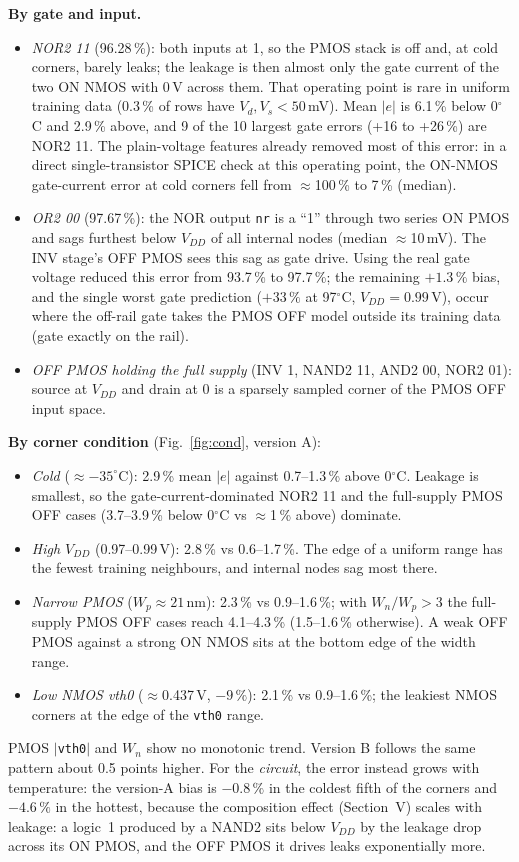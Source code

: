 ﻿\documentclass[conference,10pt]{IEEEtran}
\newcommand{\cc}[1]{\texttt{#1}}
\newcommand{\pct}{\,\%}
\begin{document}
\textbf{By gate and input.}
\begin{itemize}
\item \emph{NOR2 11} (96.28\pct): both inputs at 1, so the PMOS stack is off and, at cold corners,
barely leaks; the leakage is then almost only the gate current of the two ON NMOS with 0\,V across
them. That operating point is rare in uniform training data (0.3\pct{} of rows have $V_d,V_s<50$\,mV).
Mean $|e|$ is 6.1\pct{} below 0$^\circ$C and 2.9\pct{} above, and 9 of the 10 largest gate errors
(+16 to +26\pct) are NOR2 11. The plain-voltage features already removed most of this error: in a
direct single-transistor SPICE check at this operating point, the ON-NMOS gate-current error at
cold corners fell from $\approx$100\pct{} to 7\pct{} (median).
\item \emph{OR2 00} (97.67\pct): the NOR output \cc{nr} is a ``1'' through two series ON PMOS and
sags furthest below $V_{DD}$ of all internal nodes (median $\approx$10\,mV). The INV stage's OFF
PMOS sees this sag as gate drive. Using the real gate voltage reduced this error from 93.7\pct{} to
97.7\pct; the remaining $+1.3\pct$ bias, and the single worst gate prediction ($+33\pct$ at
97$^\circ$C, $V_{DD}=0.99$\,V), occur where the off-rail gate takes the PMOS OFF model outside its
training data (gate exactly on the rail).
\item \emph{OFF PMOS holding the full supply} (INV 1, NAND2 11, AND2 00, NOR2 01): source at
$V_{DD}$ and drain at 0 is a sparsely sampled corner of the PMOS OFF input space.
\end{itemize}

\textbf{By corner condition} (Fig.~\ref{fig:cond}, version A):
\begin{itemize}
\item \emph{Cold} ($\approx-35^\circ$C): 2.9\pct{} mean $|e|$ against 0.7--1.3\pct{} above 0$^\circ$C.
Leakage is smallest, so the gate-current-dominated NOR2 11 and the full-supply PMOS OFF cases
(3.7--3.9\pct{} below 0$^\circ$C vs $\approx$1\pct{} above) dominate.
\item \emph{High $V_{DD}$} (0.97--0.99\,V): 2.8\pct{} vs 0.6--1.7\pct{}. The edge of a uniform
range has the fewest training neighbours, and internal nodes sag most there.
\item \emph{Narrow PMOS} ($W_p\approx21$\,nm): 2.3\pct{} vs 0.9--1.6\pct{}; with $W_n/W_p>3$ the
full-supply PMOS OFF cases reach 4.1--4.3\pct{} (1.5--1.6\pct{} otherwise). A weak OFF PMOS against
a strong ON NMOS sits at the bottom edge of the width range.
\item \emph{Low NMOS vth0} ($\approx$0.437\,V, $-9\pct$): 2.1\pct{} vs 0.9--1.6\pct; the leakiest
NMOS corners at the edge of the \cc{vth0} range.
\end{itemize}
PMOS $|$\cc{vth0}$|$ and $W_n$ show no monotonic trend. Version B follows the same pattern about
0.5 points higher. For the \emph{circuit}, the error instead grows with temperature: the version-A
bias is $-0.8\pct$ in the coldest fifth of the corners and $-4.6\pct$ in the hottest, because the
composition effect (Section~V) scales with leakage: a logic~1 produced by a NAND2 sits below
$V_{DD}$ by the leakage drop across its ON PMOS, and the OFF PMOS it drives leaks exponentially
more.
\end{document}
